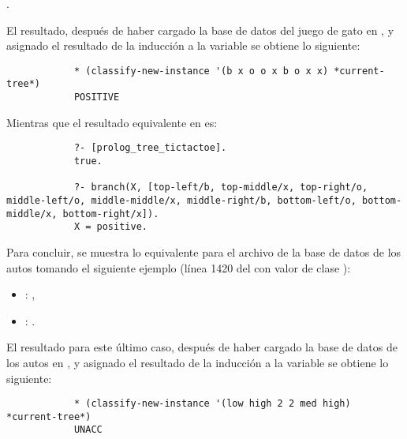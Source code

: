 \begin{itemize}
\begin{solution}
\begin{itemize}

            \code{bottom-right/x]}.
        \end{itemize}

        El resultado, después de haber cargado la base de datos del juego de gato en , y asignado el resultado de la inducción a la variable  se obtiene lo siguiente:
        \begin{verbatim}
            * (classify-new-instance '(b x o o x b o x x) *current-tree*)
            POSITIVE
        \end{verbatim}
        
        Mientras que el resultado equivalente en  es:
        \begin{verbatim}
            ?- [prolog_tree_tictactoe].
            true.

            ?- branch(X, [top-left/b, top-middle/x, top-right/o, middle-left/o, middle-middle/x, middle-right/b, bottom-left/o, bottom-middle/x, bottom-right/x]).
            X = positive.
        \end{verbatim}

        Para concluir, se muestra lo equivalente para el archivo de la base de datos de los autos tomando el siguiente ejemplo (línea 1420 del con valor de clase ):
        \begin{itemize}
            \item {}: ,
            \item {}: .
        \end{itemize}

        El resultado para este último caso, después de haber cargado la base de datos de los autos en , y asignado el resultado de la inducción a la variable  se obtiene lo siguiente:
        \begin{verbatim}
            * (classify-new-instance '(low high 2 2 med high) *current-tree*)
            UNACC
        \end{verbatim}


\end{solution}
\end{itemize}
